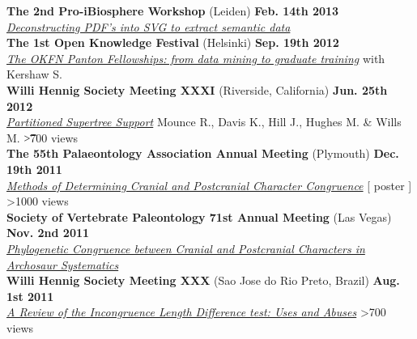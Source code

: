 \documentclass[margin,line]{resume}
\begin{document}
\begin{resume}
\vspace{-7 mm}
\textbf{The 2nd Pro-iBiosphere Workshop} (Leiden) \hfill \textbf{Feb. 14th 2013}\\
    \textsl{\href{http://wiki.pro-ibiosphere.eu/wiki/Workshops_Leiden_February_2013}{Deconstructing PDF's into SVG to extract semantic data}}\\

\vspace{-7 mm}
\textbf{The 1st Open Knowledge Festival} (Helsinki) \hfill \textbf{Sep. 19th 2012}\\
  \textsl{\href{http://okfestival.org/open-research-and-education/}{The OKFN Panton Fellowships: from data mining to graduate training}} with Kershaw S. \\
    
\vspace{-7 mm}
\textbf{Willi Hennig Society Meeting XXXI} (Riverside, California) \hfill \textbf{Jun. 25th 2012}\\
  \textsl{\href{http://prezi.com/xvas71fzr-am/hennig-xxxi/}{Partitioned Supertree Support}} Mounce R., Davis K., Hill J., Hughes M. \& Wills M. \hfill {\color{red} \t	\textgreater700 views}\\

\vspace{-7 mm}
    \textbf{The 55th Palaeontology Association Annual Meeting} (Plymouth) \hfill \textbf{Dec. 19th 2011}\\
    \textsl{\href{http://rossmounce.co.uk/posters/}{Methods of Determining Cranial and Postcranial Character Congruence}} [ poster ]\hfill {\color{red} \textgreater 1000 views}\\

\vspace{-7 mm}    
    \textbf{Society of Vertebrate Paleontology 71st Annual Meeting} (Las Vegas) \hfill \textbf{Nov. 2nd 2011}\\
    \textsl{\href{http://www.slideshare.net/rossmounce/phylogenetic-congruence-between-cranial-and-postcranial-characters-in-archosaur-systematics}{Phylogenetic Congruence between Cranial and Postcranial Characters in Archosaur Systematics}}\\

\vspace{-7 mm} 
    \textbf{Willi Hennig Society Meeting XXX} (Sao Jose do Rio Preto, Brazil) \hfill \textbf{Aug. 1st 2011}\\
    \textsl{\href{http://prezi.com/prj21wcwdlx5/ild-review/}{A Review of the Incongruence Length Difference test: Uses and Abuses}} \hfill {\color{red} \textgreater700 views}\\


\end{resume}
\end{document}
